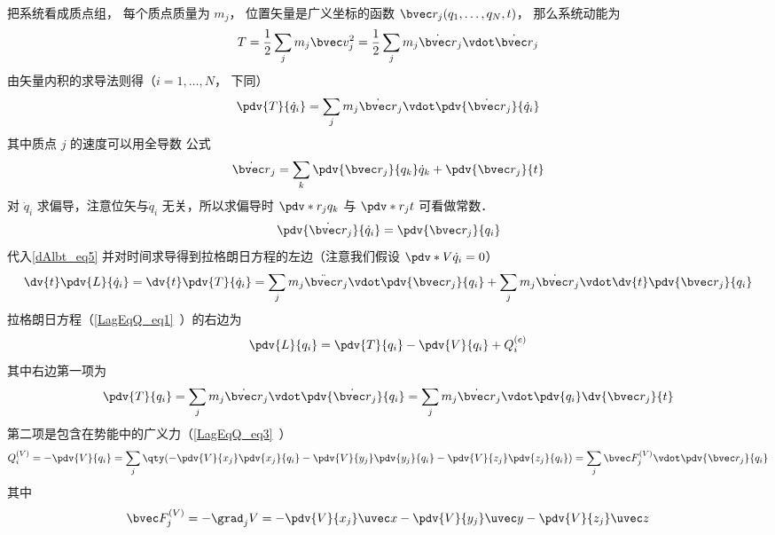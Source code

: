 把系统看成质点组， 每个质点质量为 $m_j$， 位置矢量是广义坐标的函数 $\bvec r_j(q_1,\dots,q_N,t)$， 那么系统动能为
\begin{equation}
T = \frac12 \sum_j m_j \bvec v_j^2 = \frac12 \sum_j m_j \dot{\bvec r}_j \vdot \dot{\bvec r}_j
\end{equation}
由矢量内积的求导法则得（$i=1,\dots,N$， 下同）
\begin{equation}\label{dAlbt_eq5}
\pdv{T}{\dot q_i} = \sum_j m_j \dot{\bvec r}_j \vdot \pdv{\dot{\bvec r}_j}{\dot q_i}
\end{equation}
其中质点 $j$ 的速度可以用全导数 公式
\begin{equation}
\dot{\bvec r}_j = \sum_k \pdv{\bvec r_j}{q_k} \dot q_k  + \pdv{\bvec r_j}{t}
\end{equation}
对 $\dot q_i$ 求偏导，注意位矢与$\dot q_i$ 无关，所以求偏导时 $\pdv*{r_j}{q_k}$ 与 $\pdv*{r_j}{t}$ 可看做常数．
\begin{equation}\label{dAlbt_eq27}
\pdv{\dot{\bvec r}_j}{\dot q_i} = \pdv{\bvec r_j}{q_i}
\end{equation}
代入\autoref{dAlbt_eq5} 并对时间求导得到拉格朗日方程的左边（注意我们假设 $\pdv*{V}{\dot q_i} = 0$）
\begin{equation}\label{dAlbt_eq8}
\dv{t} \pdv{L}{\dot q_i} = \dv{t} \pdv{T}{\dot q_i} = \sum_j m_j \ddot{\bvec r}_j \vdot \pdv{\bvec r_j}{q_i}  + \sum_j m_j \dot{\bvec r}_j \vdot \dv{t} \pdv{\bvec r_j}{q_i}
\end{equation}
拉格朗日方程（\autoref{LagEqQ_eq1}~）的右边为
\begin{equation}
\pdv{L}{q_i} = \pdv{T}{q_i} - \pdv{V}{q_i} + Q_i^{(e)}
\end{equation}
其中右边第一项为
\begin{equation}\label{dAlbt_eq28}
\pdv{T}{q_i} = \sum_j m_j \dot{\bvec r}_j \vdot \pdv{\dot{\bvec r}_j}{q_i} = \sum_j m_j \dot{\bvec r}_j \vdot \pdv{q_i} \dv{\bvec r_j}{t}
\end{equation}
第二项是包含在势能中的广义力（\autoref{LagEqQ_eq3}~）
\begin{equation}\label{dAlbt_eq29}
Q_i^{(V)} = - \pdv{V}{q_i} = \sum_j \qty(-\pdv{V}{x_j} \pdv{x_j}{q_i} - \pdv{V}{y_j}\pdv{y_j}{q_i} - \pdv{V}{z_j} \pdv{z_j}{q_i}) = \sum_j \bvec F_j^{(V)} \vdot \pdv{\bvec r_j}{q_i}
\end{equation}
其中
\begin{equation}\label{dAlbt_eq2}
\bvec F_j^{(V)} = - \grad_j V = -\pdv{V}{x_j}\uvec x - \pdv{V}{y_j}\uvec y - \pdv{V}{z_j} \uvec z
\end{equation}
